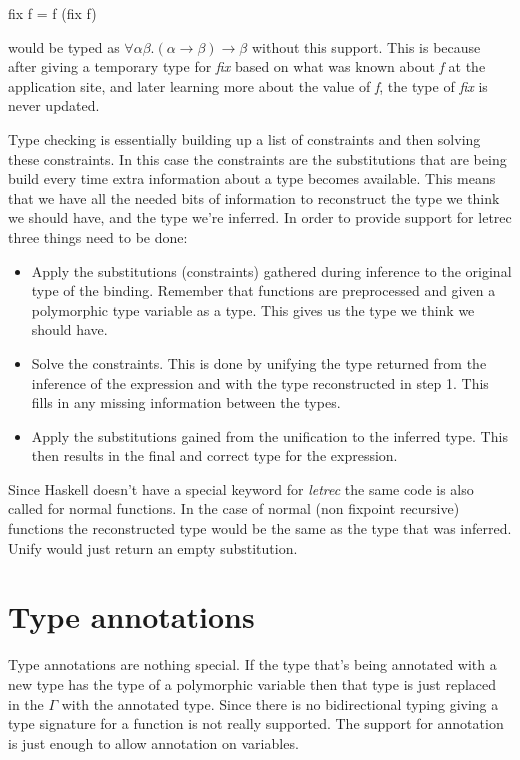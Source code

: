 \begin{code}
fix f = f (fix f)
\end{code} 

would be typed as $\forall \alpha \beta. (\alpha \rightarrow \beta) \rightarrow \beta$ without this support. This is because after giving a temporary type for \emph{fix} based on what was known about \emph{f} at the application site, and later learning more about the value of \emph{f}, the type of \emph{fix} is never updated.

Type checking is essentially building up a list of constraints and then solving these constraints. In this case the constraints are the substitutions that are being build every time extra information about a type becomes available.
This means that we have all the needed bits of information to reconstruct the type we think we should have, and the type we're inferred. In order to provide support for letrec three things need to be done:

\begin{itemize}
\item Apply the substitutions (constraints) gathered during inference to the original type of the binding. Remember that functions are preprocessed and given a polymorphic type variable as a type. This gives us the type we think we should have.
\item Solve the constraints. This is done by unifying the type returned from the inference of the expression and with the type reconstructed in step 1. This fills in any missing information between the types.
\item Apply the substitutions gained from the unification to the inferred type. This then results in the final and correct type for the expression.
\end{itemize}
Since Haskell doesn't have a special keyword for \emph{letrec} the same code is also called for normal functions. In the case of normal (non fixpoint recursive) functions the reconstructed type would be the same as the type that was inferred. Unify would just return an empty substitution.

\section{Type annotations}
Type annotations are nothing special. If the type that's being annotated with a new type has the type of a polymorphic variable then that type is just replaced in the $\Gamma$ with the annotated type. Since there is no bidirectional typing giving a type signature for a function is not really supported. The support for annotation is just enough to allow annotation on variables.
